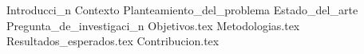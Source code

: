 \documentclass{article}
\begin{document}
  \begin{titlepage}
    \centering
    \vspace*{2cm}
    \titleblock [2cm]
    \vspace{1cm}  %
    \vfill  %
    \location \\
    \dateblock \\
    \footnotesize { \texttt{\fullversion} }
  \end{titlepage}


  \newcommand{\ab}[1]{{\color{red}\textbf{AB\@: #1}}}

  \attributionpage

  \tableofcontents
  \newpage

  \clearpage

  {Introducci_n}
  {Contexto}
  {Planteamiento_del_problema}
  {Estado_del_arte}
  {Pregunta_de_investigaci_n}
  {Objetivos.tex}
  {Metodologias.tex}
  {Resultados_esperados.tex}
  {Contribucion.tex}
  \printbibliography
\end{document}
